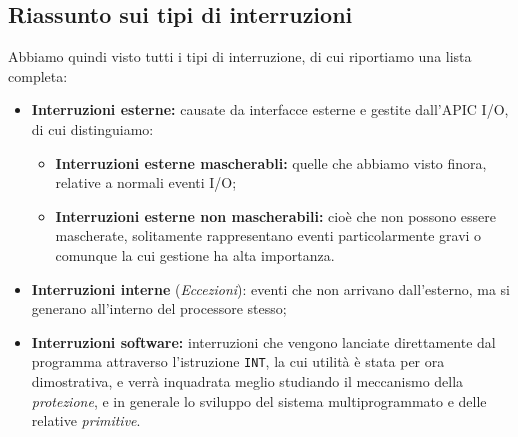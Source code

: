 \documentclass[a4paper,11pt]{article}
\begin{document}
\subsection{Riassunto sui tipi di interruzioni}
Abbiamo quindi visto tutti i tipi di interruzione, di cui riportiamo una lista completa:
\begin{itemize}
	\item \textbf{Interruzioni esterne:} causate da interfacce esterne e gestite dall'APIC I/O, di cui distinguiamo:
		\begin{itemize}
			\item \textbf{Interruzioni esterne mascherabli:} quelle che abbiamo visto finora, relative a normali eventi I/O;
			\item \textbf{Interruzioni esterne non mascherabili:} cioè che non possono essere mascherate, solitamente rappresentano eventi particolarmente gravi o comunque la cui gestione ha alta importanza.
		\end{itemize}
	\item \textbf{Interruzioni interne} (\textit{Eccezioni}): eventi che non arrivano dall'esterno, ma si generano all'interno del processore stesso;
	\item \textbf{Interruzioni software:} interruzioni che vengono lanciate direttamente dal programma attraverso l'istruzione \lstinline|INT|, la cui utilità è stata per ora dimostrativa, e verrà inquadrata meglio studiando il meccanismo della \textit{protezione}, e in generale lo sviluppo del sistema multiprogrammato e delle relative \textit{primitive}.
\end{itemize}
\end{document}

